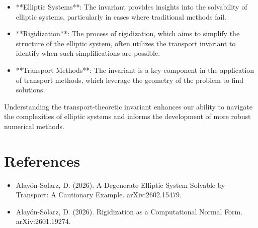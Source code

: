 \documentclass[11pt,a4paper]{article}
\begin{document}
\begin{itemize}
    \item **Elliptic Systems**: The invariant provides insights into the solvability of elliptic systems, particularly in cases where traditional methods fail.
    \item **Rigidization**: The process of rigidization, which aims to simplify the structure of the elliptic system, often utilizes the transport invariant to identify when such simplifications are possible.
    \item **Transport Methods**: The invariant is a key component in the application of transport methods, which leverage the geometry of the problem to find solutions.
\end{itemize}

Understanding the transport-theoretic invariant enhances our ability to navigate the complexities of elliptic systems and informs the development of more robust numerical methods.

\section{References}
\begin{itemize}
    \item Alayón-Solarz, D. (2026). A Degenerate Elliptic System Solvable by Transport: A Cautionary Example. arXiv:2602.15479.
    \item Alayón-Solarz, D. (2026). Rigidization as a Computational Normal Form. arXiv:2601.19274.
\end{itemize}
\end{document}
